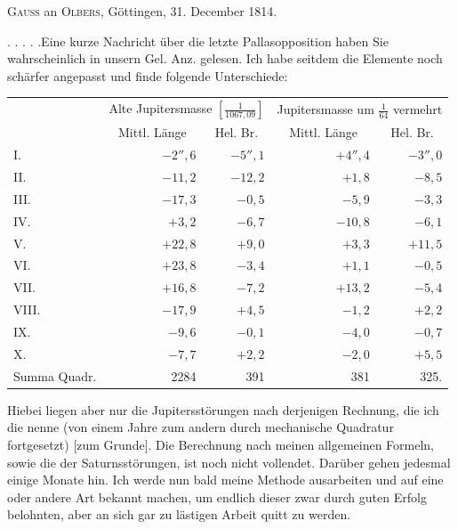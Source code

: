 \par{}\bigskip
\begin{center}
\textsc{Gauss} an \textsc{Olbers}, Göttingen, 31. December 1814.
\end{center}
\noindent\hspace*{\parindent}. . . . .\quad Eine kurze Nachricht über die letzte Pallasopposition haben Sie wahrscheinlich in unsern Gel. Anz. gelesen. Ich habe seitdem die Elemente noch schärfer angepasst und finde folgende Unterschiede:
\begin{center}
\begingroup\small\setlength{\tabcolsep}{5pt}
\begin{tabular}{@{}lrrrr@{}}
&\multicolumn{2}{c}{Alte Jupitersmasse \(\left[\frac{1}{1067{,}09}\right]\)}&\multicolumn{2}{c}{Jupitersmasse um \(\frac{1}{64}\) vermehrt}\\[3pt]
&\multicolumn{1}{c}{Mittl. Länge}&\multicolumn{1}{c}{Hel. Br.}&\multicolumn{1}{c}{Mittl. Länge}&\multicolumn{1}{c}{Hel. Br.}\\
I.&\(-2''{,}6\)&\(-5''{,}1\)&\(+4''{,}4\)&\(-3''{,}0\)\\
II.&\(-11{,}2\)&\(-12{,}2\)&\(+1{,}8\)&\(-8{,}5\)\\
III.&\(-17{,}3\)&\(-0{,}5\)&\(-5{,}9\)&\(-3{,}3\)\\
IV.&\(+3{,}2\)&\(-6{,}7\)&\(-10{,}8\)&\(-6{,}1\)\\
V.&\(+22{,}8\)&\(+9{,}0\)&\(+3{,}3\)&\(+11{,}5\)\\
VI.&\(+23{,}8\)&\(-3{,}4\)&\(+1{,}1\)&\(-0{,}5\)\\
VII.&\(+16{,}8\)&\(-7{,}2\)&\(+13{,}2\)&\(-5{,}4\)\\
VIII.&\(-17{,}9\)&\(+4{,}5\)&\(-1{,}2\)&\(+2{,}2\)\\
IX.&\(-9{,}6\)&\(-0{,}1\)&\(-4{,}0\)&\(-0{,}7\)\\
X.&\(-7{,}7\)&\(+2{,}2\)&\(-2{,}0\)&\(+5{,}5\)\\
Summa Quadr.&2284&391&381&325.
\end{tabular}
\endgroup
\end{center}
\par{}Hiebei liegen aber nur die Jupitersstörungen nach derjenigen Rechnung, die ich die  nenne (von einem Jahre zum andern durch mechanische Quadratur fortgesetzt) [zum Grunde]. Die Berechnung nach meinen allgemeinen Formeln, sowie die der Saturnsstörungen, ist noch nicht vollendet. Darüber gehen jedesmal einige Monate hin. Ich werde nun bald meine Methode ausarbeiten und auf eine oder andere Art bekannt machen, um endlich dieser zwar durch guten Erfolg belohnten, aber an sich gar zu lästigen Arbeit quitt zu werden.
\par
